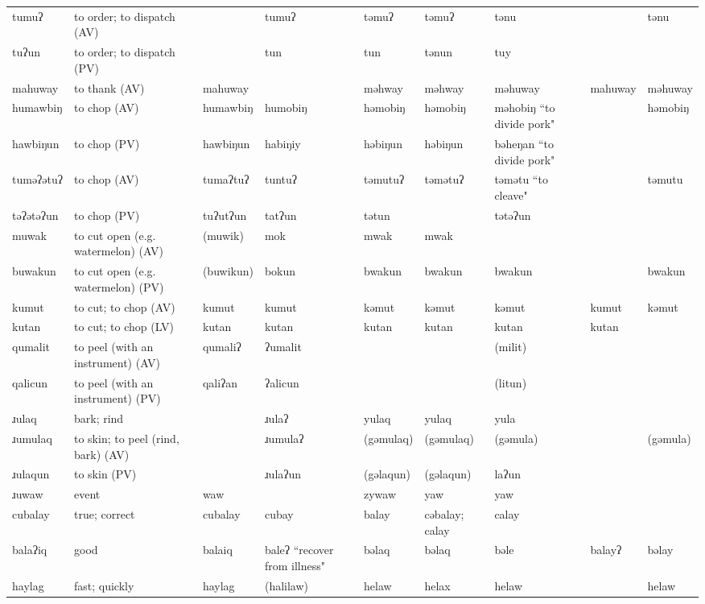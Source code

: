 \begin{landscape}
\begin{longtable}{*{9}{>{\raggedright\arraybackslash}p{}}}
\text{*}tumuʔ & to order; to dispatch (AV) &  & tumuʔ & təmuʔ & təmuʔ & tənu &  & tənu\\
\text{*}tuʔun & to order; to dispatch (PV) &  & tun & tun & tənun & tuy &  & \\
\text{*}mahuway & to thank (AV) & mahuway &  & məhway & məhway & məhuway & mahuway & məhuway\\
\text{*}humawbiŋ & to chop (AV) & humawbiŋ & humobiŋ & həmobiŋ & həmobiŋ & məhobiŋ ``to divide pork" &  & həmobiŋ\\
\text{*}hawbiŋun & to chop (PV) & hawbiŋun & habiŋiy & həbiŋun & həbiŋun & bəheŋan ``to divide pork" &  & \\
\text{*}tuməʔətuʔ & to chop (AV) & tumaʔtuʔ & tuntuʔ & təmutuʔ & təmətuʔ & təmətu \newline ``to cleave" &  & təmutu\\
\text{*}təʔətəʔun & to chop (PV) & tuʔutʔun & tatʔun & tətun &  & tətəʔun &  & \\
\text{*}muwak & to cut open (e.g. watermelon) (AV) & (muwik) & mok & mwak & mwak &  &  & \\
\text{*}buwakun & to cut open (e.g. watermelon) (PV) & (buwikun) & bokun & bwakun & bwakun & bwakun &  & bwakun\\
\text{*}kumut & to cut; to chop (AV) & kumut & kumut & kəmut & kəmut & kəmut & kumut & kəmut\\
\text{*}kutan & to cut; to chop (LV) & kutan & kutan & kutan & kutan & kutan & kutan & \\
\text{*}qumalit & to peel (with an instrument) (AV) & qumaliʔ & ʔumalit &  &  & (milit) &  & \\
\text{*}qalicun & to peel (with an instrument) (PV) & qaliʔan & ʔalicun &  &  & (litun) &  & \\
\text{*}ɹulaq & bark; rind &  & ɹulaʔ & yulaq & yulaq & yula &  & \\
\text{*}ɹumulaq & to skin; to peel (rind, bark) (AV) &  & ɹumulaʔ & (gəmulaq) & (gəmulaq) & (gəmula) &  & (gəmula)\\
\text{*}ɹulaqun & to skin (PV) &  & ɹulaʔun & (gəlaqun) & (gəlaqun) & laʔun &  & \\
\text{*}ɹuwaw & event & waw &  & zywaw & yaw & yaw &  & \\
\text{*}cubalay & true; correct & cubalay & cubay & balay & cəbalay; calay & calay &  & \\
\text{*}balaʔiq & good & balaiq & baleʔ ``recover from illness" & bəlaq & bəlaq & bəle & balayʔ & bəlay\\
\text{*}haylag & fast; quickly & haylag & (halilaw) & helaw & helax & helaw &  & helaw\\

\end{longtable}
\end{landscape}
